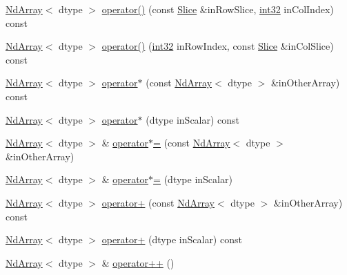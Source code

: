 \begin{DoxyCompactItemize}
\item 
\mbox{\hyperlink{class_num_cpp_1_1_nd_array}{Nd\+Array}}$<$ dtype $>$ \mbox{\hyperlink{class_num_cpp_1_1_nd_array_ae114ce7c697fa3ef25b4b860eac28cd7}{operator()}} (const \mbox{\hyperlink{class_num_cpp_1_1_slice}{Slice}} \&in\+Row\+Slice, \mbox{\hyperlink{namespace_num_cpp_acf3eb1592f8b248ff0a236634864633c}{int32}} in\+Col\+Index) const
\item 
\mbox{\hyperlink{class_num_cpp_1_1_nd_array}{Nd\+Array}}$<$ dtype $>$ \mbox{\hyperlink{class_num_cpp_1_1_nd_array_a71b49cc783ce50060e3903d8e19fb976}{operator()}} (\mbox{\hyperlink{namespace_num_cpp_acf3eb1592f8b248ff0a236634864633c}{int32}} in\+Row\+Index, const \mbox{\hyperlink{class_num_cpp_1_1_slice}{Slice}} \&in\+Col\+Slice) const
\item 
\mbox{\hyperlink{class_num_cpp_1_1_nd_array}{Nd\+Array}}$<$ dtype $>$ \mbox{\hyperlink{class_num_cpp_1_1_nd_array_aa1b1026b5e8ec836e8b8a5c691ac39ef}{operator$\ast$}} (const \mbox{\hyperlink{class_num_cpp_1_1_nd_array}{Nd\+Array}}$<$ dtype $>$ \&in\+Other\+Array) const
\item 
\mbox{\hyperlink{class_num_cpp_1_1_nd_array}{Nd\+Array}}$<$ dtype $>$ \mbox{\hyperlink{class_num_cpp_1_1_nd_array_a568ee4f337eed708e51242f78362fc6c}{operator$\ast$}} (dtype in\+Scalar) const
\item 
\mbox{\hyperlink{class_num_cpp_1_1_nd_array}{Nd\+Array}}$<$ dtype $>$ \& \mbox{\hyperlink{class_num_cpp_1_1_nd_array_abce0089c3e8fc1a45035772627b3beaa}{operator$\ast$=}} (const \mbox{\hyperlink{class_num_cpp_1_1_nd_array}{Nd\+Array}}$<$ dtype $>$ \&in\+Other\+Array)
\item 
\mbox{\hyperlink{class_num_cpp_1_1_nd_array}{Nd\+Array}}$<$ dtype $>$ \& \mbox{\hyperlink{class_num_cpp_1_1_nd_array_a7e3a903716269b996fb7d44cc96ce23f}{operator$\ast$=}} (dtype in\+Scalar)
\item 
\mbox{\hyperlink{class_num_cpp_1_1_nd_array}{Nd\+Array}}$<$ dtype $>$ \mbox{\hyperlink{class_num_cpp_1_1_nd_array_abedae68ef9da54acff245f2546f2dab5}{operator+}} (const \mbox{\hyperlink{class_num_cpp_1_1_nd_array}{Nd\+Array}}$<$ dtype $>$ \&in\+Other\+Array) const
\item 
\mbox{\hyperlink{class_num_cpp_1_1_nd_array}{Nd\+Array}}$<$ dtype $>$ \mbox{\hyperlink{class_num_cpp_1_1_nd_array_a17a982e38f88112fa5139675bc3f8d6e}{operator+}} (dtype in\+Scalar) const
\item 
\mbox{\hyperlink{class_num_cpp_1_1_nd_array}{Nd\+Array}}$<$ dtype $>$ \& \mbox{\hyperlink{class_num_cpp_1_1_nd_array_ab02d7b130ec279b2da5ed2ac5b976b43}{operator++}} ()

\end{DoxyCompactItemize}
